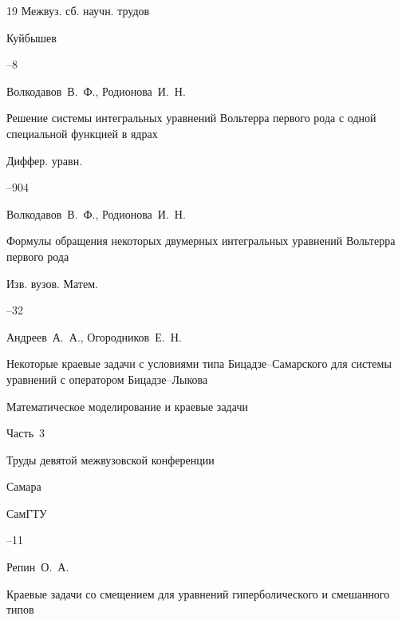 \begin{thebibliography}{19}
\bookinfo Межвуз. сб. научн. трудов

\publaddr Куйбышев 


--8




\by Волкодавов~В.~Ф., Родионова~И.~Н.

\paper Решение системы интегральных уравнений Вольтерра первого рода с одной специальной функцией в ядрах 

\jour Диффер. уравн.




–904





\by Волкодавов~В.~Ф., Родионова~И.~Н.

\paper Формулы обращения некоторых двумерных интегральных уравнений Вольтерра первого рода

\jour Изв. вузов. Матем.



–32 





\by Андреев~А.~А., Огородников~Е.~Н.

\paper Некоторые краевые задачи с условиями типа Бицадзе--Самарского для системы уравнений с оператором Бицадзе--Лыкова

\inbook Математическое моделирование и краевые задачи

\issueinfo Часть~3

\bookinfo Труды девятой межвузовской конференции

\publaddr Самара

\publ СамГТУ


--11




\by Репин~О.~А.

\book Краевые задачи со смещением для уравнений гиперболического и смешанного типов


\end{thebibliography}
